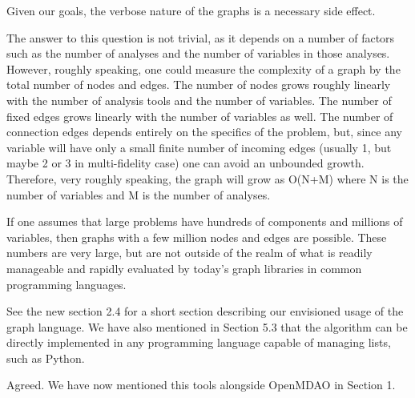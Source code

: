 \documentclass{aiaa-tc}
\begin{document}
Given our goals, the verbose nature of the graphs is a necessary side effect. 


The answer to this question is not trivial, as it depends on a number of factors such as the number of analyses and the number of variables in those analyses. However, roughly speaking, one could measure the complexity of a graph by the total number of nodes and edges. The number of nodes grows roughly linearly with the number of analysis tools and the number of variables. The number of fixed edges grows linearly with the number of variables as well. The number of connection edges depends entirely on the specifics of the problem, but, since any variable will have only a small finite number of incoming edges (usually 1, but maybe 2 or 3 in multi-fidelity case) one can avoid an unbounded growth. Therefore, very roughly speaking, the graph will grow as O(N+M) where N is the number of variables and M is the number of analyses. 

If one assumes that large problems have hundreds of components and millions of variables, then graphs with a few million nodes and edges are possible. These numbers are very large, but are not outside of the realm of what is readily manageable and rapidly evaluated by today's graph libraries in common programming languages. 


See the new section 2.4 for a short section describing our envisioned usage 
of the graph language. 
We have also mentioned in Section 5.3 that the algorithm can be directly implemented in any programming language capable of managing lists, such as Python.


Agreed. We have now mentioned this tools alongside OpenMDAO in  Section 1. 

\end{document}
